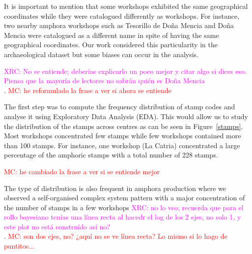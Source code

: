 \documentclass[review]{elsarticle}
\newcommand{\memo}[2]{\textcolor{#1}{#2}}
\newcommand{\maria}[1]{\memo{red}{MC: #1\\}}
\newcommand{\xavi}[1]{\memo{magenta}{XRC: #1\\}}
\begin{document}

It is important to mention that some workshops exhibited the same geographical coordinates while they were catalogued differently as workshops. For instance, two nearby amphora workshops such as Tesorillo de Doña Mencia and Doña Mencia were catalogued as a different name in spite of having the same geographical coordinates.  Our work considered this particularity in the archaeological dataset but some biases can occur in the analysis. 


\xavi{No se entiende; deberías explicarlo un poco mejor y citar algo si dices eso. Piensa que la mayoría de lectores no sabrán quién es Doña Mencia}. 
\maria{he reformulado la frase a ver si ahora se entiende}

The first step was to compute the frequency distribution of stamp codes and analyse it using Exploratory Data Analysis (EDA). This would allow us to study the distribution of the stamps across centres as can be seen in Figure~\ref{stamps}. Most workshops concentrated few stamps while few workshops contained more than 100 stamps. For instance, one workshop (La Catria) concentrated a large percentage of the amphoric stamps with a total number of 228 stamps.


\maria{he cambiado la frase a ver si se entiende mejor}


The type of distribution is also frequent in amphora production where we observed a self-organised complex system pattern with a major concentration of the number of stamps in a few workshops \citep{bayesian_2018,coto-sarmiento_identifying_2018}\xavi{no lo veo; recuerda que para el rollo bayesiano tenías una línea recta al hacedr el log de los 2 ejes, no solo 1, y este plot no está construído así no?}.
\maria{son dos ejes, no? ¿aquí no se ve línea recta? Lo mismo si lo hago de puntitos...}
\end{document}
